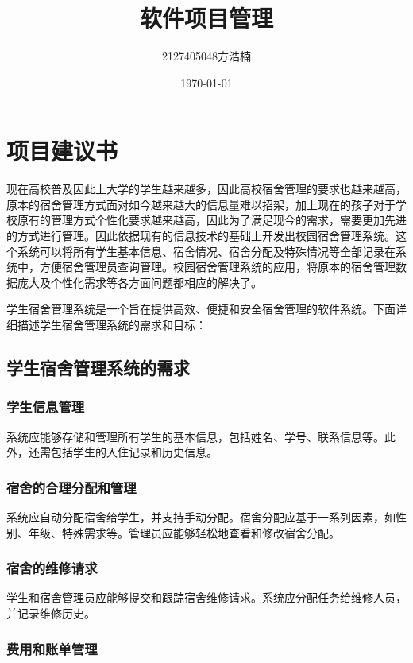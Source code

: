 \documentclass[UTF-8]{ctexart}
\title{软件项目管理}
\author{2127405048方浩楠}
\date{\today}
\begin{document}
\maketitle

\tableofcontents
\newpage

\section{项目建议书}
现在高校普及因此上大学的学生越来越多，因此高校宿舍管理的要求也越来越高，原本的宿舍管理方式面对如今越来越大的信息量难以招架，加上现在的孩子对于学校原有的管理方式个性化要求越来越高，因此为了满足现今的需求，需要更加先进的方式进行管理。因此依据现有的信息技术的基础上开发出校园宿舍管理系统。这个系统可以将所有学生基本信息、宿舍情况、宿舍分配及特殊情况等全部记录在系统中，方便宿舍管理员查询管理。校园宿舍管理系统的应用，将原本的宿舍管理数据庞大及个性化需求等各方面问题都相应的解决了。

学生宿舍管理系统是一个旨在提供高效、便捷和安全宿舍管理的软件系统。下面详细描述学生宿舍管理系统的需求和目标：

\subsection{学生宿舍管理系统的需求}

\subsubsection{学生信息管理}

系统应能够存储和管理所有学生的基本信息，包括姓名、学号、联系信息等。此外，还需包括学生的入住记录和历史信息。

\subsubsection{宿舍的合理分配和管理}

系统应自动分配宿舍给学生，并支持手动分配。宿舍分配应基于一系列因素，如性别、年级、特殊需求等。管理员应能够轻松地查看和修改宿舍分配。

\subsubsection{宿舍的维修请求}

学生和宿舍管理员应能够提交和跟踪宿舍维修请求。系统应分配任务给维修人员，并记录维修历史。

\subsubsection{费用和账单管理}
\end{document}
